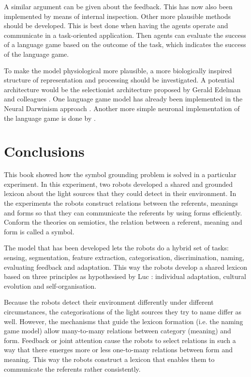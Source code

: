A similar argument can be given about the feedback. This has now also been implemented by means of internal inspection. Other more plausible methods should be developed. This is best done when having the agents operate and communicate in a task-oriented application. Then agents can evaluate the success of a language game based on the outcome of the task, which indicates the success of the language game. 


To make the model physiological more plausible, a more biologically inspired structure of representation and processing should be investigated. A potential architecture would be the selectionist architecture proposed by Gerald Edelman and colleagues \citep{edelman:1987}. One language game model has already been implemented in the Neural Darwinism approach \citep{popescu-belis:1997}. Another more simple neuronal implementation of the language game is done by \citet{dircksstoness:1999}.

\section{Conclusions}

This book showed how the symbol grounding problem is solved in a particular experiment. In this experiment, two robots developed a shared and grounded lexicon about the light sources that they could detect in their environment. In the experiments the robots construct relations between the referents, meanings and forms so that they can communicate the referents by using forms efficiently. Conform the theories on semiotics, the relation between a referent, meaning and form is called a symbol.

The model that has been developed lets the robots do a hybrid set of tasks: sensing, segmentation, feature extraction, categorisation, discrimination, naming, evaluating feedback and adaptation. This way the robots develop a shared lexicon based on three principles as hypothesised by Luc \citet{steels:1996a}: individual adaptation, cultural evolution and self-organisation. 

Because the robots detect their environment differently under different circumstances, the categorisations of the light sources they try to name differ as well. However, the mechanisms that guide the lexicon formation (i.e. the naming game model) allow many-to-many relations between category (meaning) and form. Feedback or joint attention cause the robots to select relations in such a way that there emerges more or less one-to-many relations between form and meaning. This way the robots construct a lexicon that enables them to communicate the referents rather consistently. 

